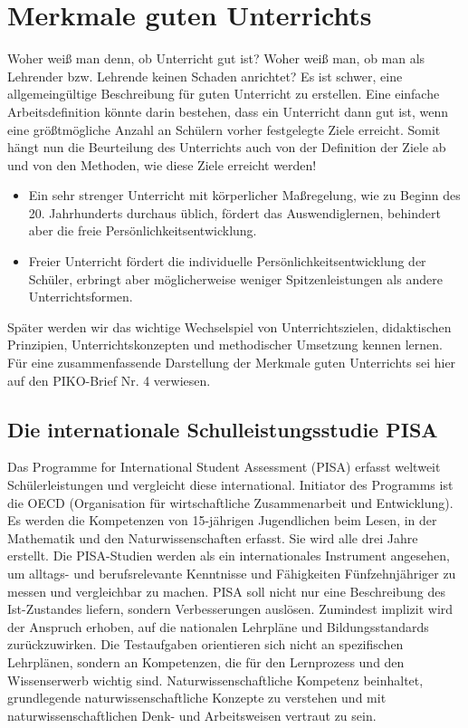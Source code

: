 \chapter{Merkmale guten Unterrichts}\label{GuterUnterricht}
Woher weiß man denn, ob Unterricht gut ist? Woher weiß man, ob man als Lehrender bzw. Lehrende keinen Schaden 
anrichtet? Es ist schwer,  eine allgemeing{\"u}ltige Beschreibung f{\"u}r guten Unterricht zu erstellen. Eine einfache Arbeitsdefinition k{\"o}nnte darin
bestehen, dass ein Unterricht dann gut ist, wenn eine gr{\"o}{\ss}tm{\"o}gliche Anzahl an Sch{\"u}lern vorher
festgelegte Ziele erreicht. Somit h{\"a}ngt nun die Beurteilung des Unterrichts auch von der Definition der Ziele ab und von den Methoden, wie diese Ziele erreicht werden!

\begin{beisp}
\begin{itemize}
\item
Ein sehr strenger Unterricht mit k{\"o}rperlicher Ma{\ss}regelung, wie zu Beginn des 20. Jahrhunderts durchaus {\"u}blich,
f{\"o}rdert das Auswendiglernen, behindert aber die freie Pers{\"o}nlichkeitsentwicklung.
\item
Freier Unterricht f{\"o}rdert die individuelle Pers{\"o}nlichkeitsentwicklung der Sch{\"u}ler, erbringt aber 
m{\"o}glicherweise weniger Spitzenleistungen als andere Unterrichtsformen.
\end{itemize}
\end{beisp}

Sp{\"a}ter werden wir das wichtige Wechselspiel von Unterrichtszielen, didaktischen Prinzipien, Unterrichtskonzepten und 
methodischer Umsetzung kennen lernen. F{\"u}r eine zusammenfassende Darstellung der Merkmale guten Unterrichts sei
hier auf den PIKO-Brief Nr. 4 verwiesen.

\bip\bip
\section{Die internationale Schulleistungsstudie PISA}
Das {\glqq}Programme for International Student Assessment{\grqq} (PISA) erfasst weltweit Sch{\"u}lerleistungen und vergleicht diese international. 
Initiator des Programms ist die OECD (Organisation f{\"u}r wirtschaftliche Zusammenarbeit und Entwicklung). Es werden 
 die Kompetenzen von 15-j{\"a}hrigen Jugendlichen beim Lesen, in der Mathematik
und den Naturwissenschaften erfasst. Sie wird alle drei Jahre erstellt. Die PISA-Studien werden als ein internationales 
Instrument angesehen, um alltags- und berufsrelevante Kenntnisse und F{\"a}higkeiten F{\"u}nfzehnj{\"a}hriger zu messen und vergleichbar zu machen.
PISA soll nicht nur eine Beschreibung des Ist-Zustandes liefern, sondern Verbesserungen ausl{\"o}sen. Zumindest  implizit wird der Anspruch 
erhoben, auf die nationalen Lehrpl{\"a}ne und Bildungsstandards zur{\"u}ckzuwirken.
\mip
Die Testaufgaben orientieren sich nicht an spezifischen Lehrpl\"{a}nen, sondern an Kompetenzen, die f{\"u}r den
Lernprozess und den Wissenserwerb wichtig sind. Naturwissenschaftliche Kompetenz beinhaltet, grundlegende 
naturwissenschaftliche Konzepte zu verstehen und mit naturwissenschaftlichen Denk- und Arbeitsweisen
vertraut zu sein.  


